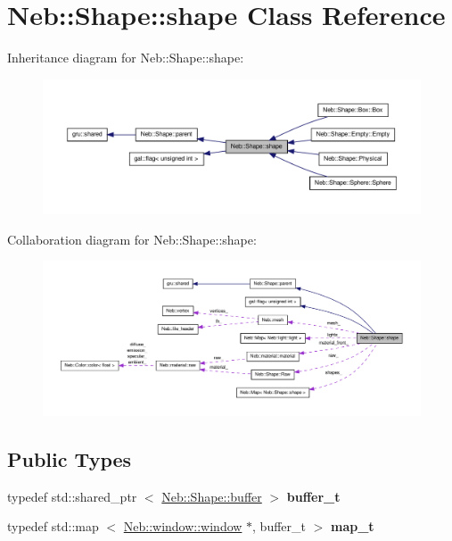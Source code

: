 \hypertarget{classNeb_1_1Shape_1_1shape}{\section{\-Neb\-:\-:\-Shape\-:\-:shape \-Class \-Reference}
\label{classNeb_1_1Shape_1_1shape}
}


\-Inheritance diagram for \-Neb\-:\-:\-Shape\-:\-:shape\-:\nopagebreak
\begin{figure}[H]
\begin{center}
\leavevmode
\includegraphics[width=350pt]{classNeb_1_1Shape_1_1shape__inherit__graph}
\end{center}
\end{figure}


\-Collaboration diagram for \-Neb\-:\-:\-Shape\-:\-:shape\-:\nopagebreak
\begin{figure}[H]
\begin{center}
\leavevmode
\includegraphics[width=350pt]{classNeb_1_1Shape_1_1shape__coll__graph}
\end{center}
\end{figure}
\subsection*{\-Public \-Types}
\begin{DoxyCompactItemize}
\item 
\hypertarget{classNeb_1_1Shape_1_1shape_adeae7cac9264b6e69472cc6805595d98}{typedef std\-::shared\-\_\-ptr\*
$<$ \hyperlink{classNeb_1_1Shape_1_1buffer}{\-Neb\-::\-Shape\-::buffer} $>$ {\bfseries buffer\-\_\-t}}\label{classNeb_1_1Shape_1_1shape_adeae7cac9264b6e69472cc6805595d98}

\item 
\hypertarget{classNeb_1_1Shape_1_1shape_a2e96cc27b784e0aef915f8e1e0419279}{typedef std\-::map\*
$<$ \hyperlink{classNeb_1_1window_1_1window}{\-Neb\-::window\-::window} \*
$\ast$, buffer\-\_\-t $>$ {\bfseries map\-\_\-t}}\label{classNeb_1_1Shape_1_1shape_a2e96cc27b784e0aef915f8e1e0419279}

\end{DoxyCompactItemize}
